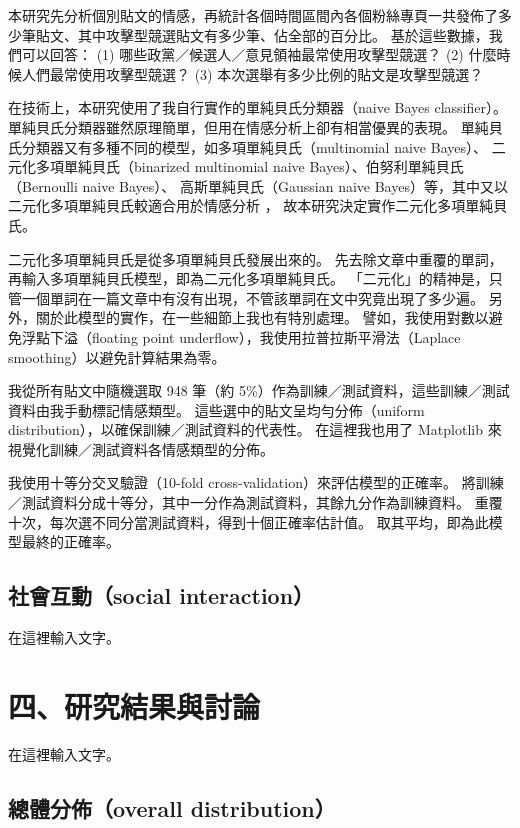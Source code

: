 \documentclass[letterpaper, 10pt, conference]{ieeeconf}   %
\begin{document}
\begin{CJK}{UTF8}{bsmi}
本研究先分析個別貼文的情感，再統計各個時間區間內各個粉絲專頁一共發佈了多少筆貼文、其中攻擊型競選貼文有多少筆、佔全部的百分比。
基於這些數據，我們可以回答：
 (1) 哪些政黨／候選人／意見領袖最常使用攻擊型競選？
 (2) 什麼時候人們最常使用攻擊型競選？
 (3) 本次選舉有多少比例的貼文是攻擊型競選？

在技術上，本研究使用了我自行實作的單純貝氏分類器（naive Bayes classifier）\cite{c13}。
單純貝氏分類器雖然原理簡單，但用在情感分析上卻有相當優異的表現。
單純貝氏分類器又有多種不同的模型，如多項單純貝氏（multinomial naive Bayes）、
二元化多項單純貝氏（binarized multinomial naive Bayes）、伯努利單純貝氏（Bernoulli naive Bayes）、
高斯單純貝氏（Gaussian naive Bayes）等，其中又以二元化多項單純貝氏較適合用於情感分析 \cite{c14}，
故本研究決定實作二元化多項單純貝氏。

二元化多項單純貝氏是從多項單純貝氏發展出來的。
先去除文章中重覆的單詞，再輸入多項單純貝氏模型，即為二元化多項單純貝氏。
「二元化」的精神是，只管一個單詞在一篇文章中有沒有出現，不管該單詞在文中究竟出現了多少遍。
另外，關於此模型的實作，在一些細節上我也有特別處理。
譬如，我使用對數以避免浮點下溢（floating point underflow），我使用拉普拉斯平滑法（Laplace smoothing）以避免計算結果為零。

我從所有貼文中隨機選取 948 筆（約 5\%）作為訓練／測試資料，這些訓練／測試資料由我手動標記情感類型。
這些選中的貼文呈均勻分佈（uniform distribution），以確保訓練／測試資料的代表性。
在這裡我也用了 Matplotlib 來視覺化訓練／測試資料各情感類型的分佈。

我使用十等分交叉驗證（10-fold cross-validation）來評估模型的正確率。
將訓練／測試資料分成十等分，其中一分作為測試資料，其餘九分作為訓練資料。
重覆十次，每次選不同分當測試資料，得到十個正確率估計值。
取其平均，即為此模型最終的正確率。

\subsection*{社會互動（social interaction）}

在這裡輸入文字。

\section*{四、研究結果與討論}

在這裡輸入文字。

\subsection*{總體分佈（overall distribution）}


\end{CJK}
\end{document}

